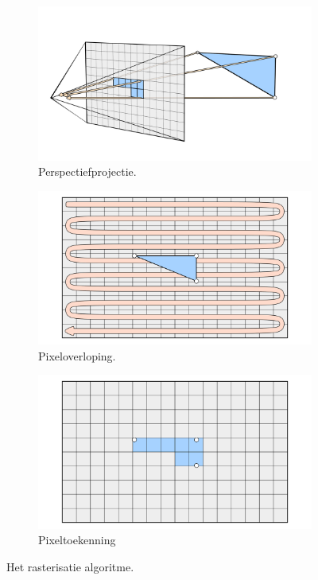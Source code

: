 \begin{figure}
  \centering
  \begin{subfigure}[b]{0.33\textwidth}
    \includegraphics[width=\textwidth]{./img/raw/rs-rasterisatie/rasterisation1.png}
    \caption{Perspectiefprojectie.}
    \label{fig:rs-rasterisatie:1}
  \end{subfigure}%
  \begin{subfigure}[b]{0.33\textwidth}
    \includegraphics[width=\textwidth]{./img/raw/rs-rasterisatie/rasterisation2.png}
    \caption{Pixeloverloping.}
    \label{fig:rs-rasterisatie:2}
  \end{subfigure}%
  \begin{subfigure}[b]{0.33\textwidth}
    \includegraphics[width=\textwidth]{./img/raw/rs-rasterisatie/rasterisation3.png}
    \caption{Pixeltoekenning}
    \label{fig:rs-rasterisatie:3}
  \end{subfigure}%
  \caption{Het rasterisatie algoritme.}
  \label{fig:rs-rasterisatie}
\end{figure}
